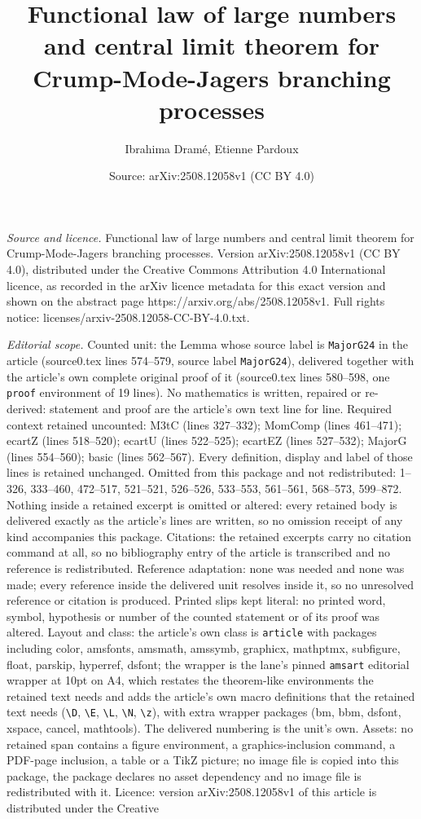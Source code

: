 \documentclass[10pt,a4paper]{amsart}
\title[Functional law of large numbers and central limit theorem fo]{Functional law of large numbers and central limit theorem for Crump-Mode-Jagers branching processes}
\author{Ibrahima Dram\'e, Etienne Pardoux}
\date{Source: arXiv:2508.12058v1 (CC BY 4.0)}
\begin{document}
\maketitle

\noindent\emph{Source and licence.} Functional law of large numbers and central limit theorem for Crump-Mode-Jagers branching processes. Version arXiv:2508.12058v1 (CC BY 4.0), distributed under the Creative Commons Attribution 4.0 International licence, as recorded in the arXiv licence metadata for this exact version and shown on the abstract page https://arxiv.org/abs/2508.12058v1. Full rights notice: licenses/arxiv-2508.12058-CC-BY-4.0.txt.\par\smallskip

\noindent\textit{Editorial scope.} Counted unit: the Lemma whose source label is \texttt{MajorG24} in the article (source0.tex lines 574--579, source label \texttt{MajorG24}), delivered together with the article's own complete original proof of it (source0.tex lines 580--598, one \texttt{proof} environment of 19 lines). No mathematics is written, repaired or re-derived: statement and proof are the article's own text line for line. Required context retained uncounted: M3tC (lines 327--332); MomComp (lines 461--471); ecartZ (lines 518--520); ecartU (lines 522--525); ecartEZ (lines 527--532); MajorG (lines 554--560); basic (lines 562--567). Every definition, display and label of those lines is retained unchanged. Omitted from this package and not redistributed: 1--326, 333--460, 472--517, 521--521, 526--526, 533--553, 561--561, 568--573, 599--872. Nothing inside a retained excerpt is omitted or altered: every retained body is delivered exactly as the article's lines are written, so no omission receipt of any kind accompanies this package. Citations: the retained excerpts carry no citation command at all, so no bibliography entry of the article is transcribed and no reference is redistributed. Reference adaptation: none was needed and none was made; every reference inside the delivered unit resolves inside it, so no unresolved reference or citation is produced. Printed slips kept literal: no printed word, symbol, hypothesis or number of the counted statement or of its proof was altered. Layout and class: the article's own class is \texttt{article} with packages including color, amsfonts, amsmath, amssymb, graphicx, mathptmx, subfigure, float, parskip, hyperref, dsfont; the wrapper is the lane's pinned \texttt{amsart} editorial wrapper at 10pt on A4, which restates the theorem-like environments the retained text needs and adds the article's own macro definitions that the retained text needs (\texttt{\textbackslash D}, \texttt{\textbackslash E}, \texttt{\textbackslash L}, \texttt{\textbackslash N}, \texttt{\textbackslash z}), with extra wrapper packages (bm, bbm, dsfont, xspace, cancel, mathtools). The delivered numbering is the unit's own. Assets: no retained span contains a figure environment, a graphics-inclusion command, a PDF-page inclusion, a table or a TikZ picture; no image file is copied into this package, the package declares no asset dependency and no image file is redistributed with it. Licence: version arXiv:2508.12058v1 of this article is distributed under the Creative 
\end{document}
